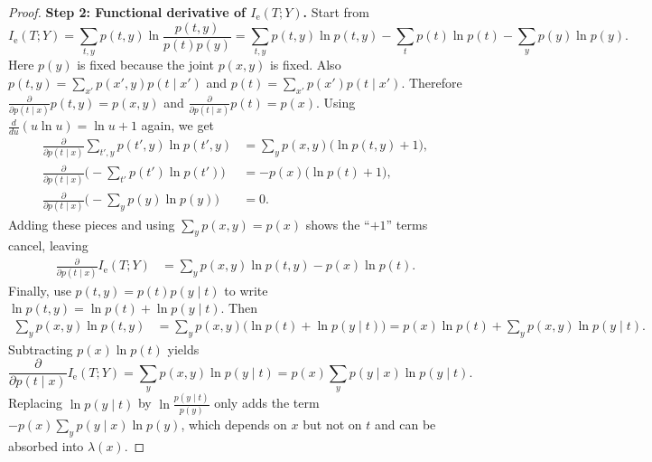 \documentclass{article}
\numberwithin{equation}{section}
\begin{document}
\begin{proof}
\textbf{Step 2: Functional derivative of $I_{\mathrm{e}}(T;Y)$.}
Start from
\begin{equation}
    I_{\mathrm{e}}(T;Y)
    = \sum_{t,y} p(t,y)\ln\frac{p(t,y)}{p(t)p(y)}
    = \sum_{t,y} p(t,y)\ln p(t,y) - \sum_t p(t)\ln p(t) - \sum_y p(y)\ln p(y).
\end{equation}
Here $p(y)$ is fixed because the joint $p(x,y)$ is fixed.
Also $p(t,y)=\sum_{x'} p(x',y)p(t\mid x')$ and $p(t)=\sum_{x'} p(x')p(t\mid x')$.
Therefore
\(\frac{\partial}{\partial p(t\mid x)}p(t,y)=p(x,y)\) and \(\frac{\partial}{\partial p(t\mid x)}p(t)=p(x)\).
Using $\frac{d}{du}(u\ln u)=\ln u+1$ again, we get
\begin{align}
    \frac{\partial}{\partial p(t\mid x)}\sum_{t',y} p(t',y)\ln p(t',y)
    &= \sum_y p(x,y)\big(\ln p(t,y)+1\big),\\
    \frac{\partial}{\partial p(t\mid x)}\Big(-\sum_{t'} p(t')\ln p(t')\Big)
    &= -p(x)\big(\ln p(t)+1\big),\\
    \frac{\partial}{\partial p(t\mid x)}\Big(-\sum_y p(y)\ln p(y)\Big)
    &= 0.
\end{align}
Adding these pieces and using $\sum_y p(x,y)=p(x)$ shows the ``$+1$'' terms cancel, leaving
\begin{align}
    \frac{\partial}{\partial p(t\mid x)} I_{\mathrm{e}}(T;Y)
    &= \sum_y p(x,y)\ln p(t,y) - p(x)\ln p(t).
\end{align}
Finally, use $p(t,y)=p(t)p(y\mid t)$ to write $\ln p(t,y)=\ln p(t)+\ln p(y\mid t)$.
Then
\begin{align}
    \sum_y p(x,y)\ln p(t,y)
    &= \sum_y p(x,y)\big(\ln p(t)+\ln p(y\mid t)\big)
     = p(x)\ln p(t) + \sum_y p(x,y)\ln p(y\mid t).
\end{align}
Subtracting $p(x)\ln p(t)$ yields
\begin{equation}
\label{eq:var-ITY}
    \frac{\partial}{\partial p(t\mid x)} I_{\mathrm{e}}(T;Y)
    = \sum_y p(x,y)\ln p(y\mid t)
    = p(x)\sum_y p(y\mid x)\ln p(y\mid t).
\end{equation}
Replacing $\ln p(y\mid t)$ by $\ln\frac{p(y\mid t)}{p(y)}$ only adds the term
\(-p(x)\sum_y p(y\mid x)\ln p(y)\), which depends on $x$ but not on $t$ and can be absorbed into $\lambda(x)$.


\end{proof}
\end{document}
